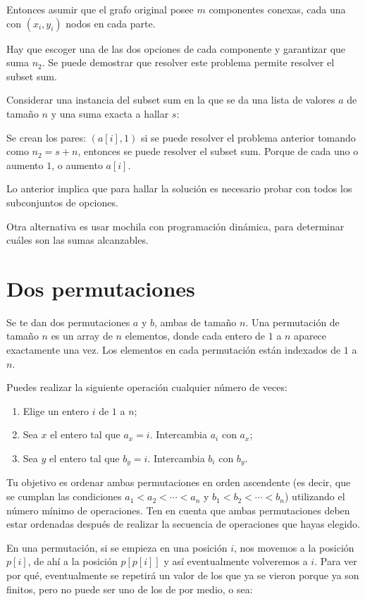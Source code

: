 \documentclass[14pt]{extarticle}
\begin{document}
Entonces asumir que el grafo original posee $m$ componentes conexas, cada una con $(x_i, y_i)$ nodos en cada parte.

Hay que escoger una de las dos opciones de cada componente y garantizar que suma $n_2$. Se puede demostrar que resolver este problema permite resolver el subset sum.

Considerar una instancia del subset sum en la que se da una lista de valores $a$ de tamaño $n$ y una suma exacta a hallar $s$:

Se crean los pares: $(a[i], 1)$ si se puede resolver el problema anterior tomando como $n_2 = s + n$, entonces se puede resolver el subset sum. Porque de cada uno o aumento $1$, o aumento $a[i]$.

Lo anterior implica que para hallar la solución es necesario probar con todos los subconjuntos de opciones.

Otra alternativa es usar mochila con programación dinámica, para determinar cuáles son las sumas alcanzables.

\section*{Dos permutaciones}

Se te dan dos permutaciones $a$ y $b$, ambas de tamaño $n$. Una permutación de tamaño $n$ es un array de $n$ elementos, donde cada entero de $1$ a $n$ aparece exactamente una vez. Los elementos en cada permutación están indexados de $1$ a $n$.

Puedes realizar la siguiente operación cualquier número de veces:

\begin{enumerate}
    \item Elige un entero $i$ de $1$ a $n$;
    \item Sea $x$ el entero tal que $a_x = i$. Intercambia $a_i$ con $a_x$;
    \item Sea $y$ el entero tal que $b_y = i$. Intercambia $b_i$ con $b_y$.
\end{enumerate}

Tu objetivo es ordenar ambas permutaciones en orden ascendente (es decir, que se cumplan las condiciones $a_1 < a_2 < \cdots < a_n$ y $b_1 < b_2 < \cdots < b_n$) utilizando el número mínimo de operaciones. Ten en cuenta que ambas permutaciones deben estar ordenadas después de realizar la secuencia de operaciones que hayas elegido.

En una permutación, si se empieza en una posición $i$, nos movemos a la posición $p[i]$, de ahí a la posición $p[p[i]]$ y así eventualmente volveremos a $i$. Para ver por qué, eventualmente se repetirá un valor de los que ya se vieron porque ya son finitos, pero no puede ser uno de los de por medio, o sea:
\end{document}
